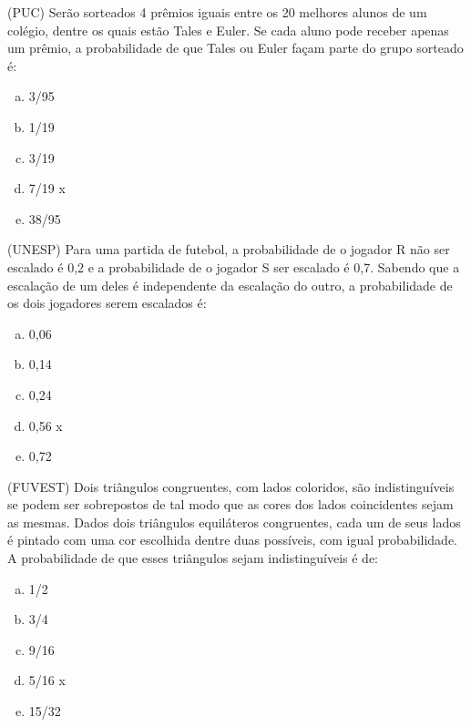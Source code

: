 \item (PUC) Serão sorteados 4 prêmios iguais entre os 20 melhores alunos de um colégio, dentre os quais estão Tales e Euler. Se cada aluno pode receber apenas um prêmio, a probabilidade de que Tales ou Euler façam parte do grupo sorteado é:
\begin{multicols}{5}
\begin{enumerate}[a)]
	\item 3/95
	\item 1/19
	\item 3/19
	\item 7/19  x
	\item 38/95
\end{enumerate}
\end{multicols}

\item (UNESP) Para uma partida de futebol, a probabilidade de o jogador R não ser escalado é 0,2 e a probabilidade de o jogador S ser escalado é 0,7. Sabendo que a escalação de um deles é independente da escalação do outro, a probabilidade de os dois jogadores serem escalados é:
\begin{multicols}{5}
\begin{enumerate}[a)]
	\item 0,06
	\item 0,14
	\item 0,24
	\item 0,56 x
	\item 0,72 
\end{enumerate}
\end{multicols}

\item (FUVEST) Dois triângulos congruentes, com lados coloridos, são indistinguíveis se podem ser sobrepostos de tal modo que as cores dos lados coincidentes sejam as mesmas. Dados dois triângulos equiláteros congruentes, cada um de seus lados é pintado com uma cor escolhida dentre duas possíveis, com igual probabilidade. A probabilidade de que esses triângulos sejam indistinguíveis é de:
\begin{multicols}{5}
\begin{enumerate}[a)]
	\item 1/2
	\item 3/4
	\item 9/16 
	\item 5/16  x
	\item 15/32
\end{enumerate}
\end{multicols}

